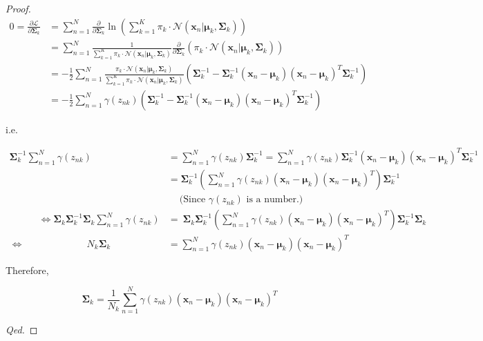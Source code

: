 \documentclass{article}
\begin{document}
\begin{proof}
    \vspace{-3em}
    \begin{align*}
        0 = \frac{\partial\mathcal{L}}{\partial\boldsymbol{\Sigma}_k} &= \sum_{n=1}^N\frac{\partial}{\partial\boldsymbol{\Sigma}_k}\ln\left(\sum_{k=1}^K\pi_k\cdot\mathcal{N}(\mathbf{x}_n|\boldsymbol{\mu}_k,\boldsymbol{\Sigma}_k)\right) \\
        &= \sum_{n=1}^N\frac{1}{\sum_{k=1}^K\pi_k\cdot\mathcal{N}(\mathbf{x}_n|\boldsymbol{\mu}_k,\boldsymbol{\Sigma}_k)}\frac{\partial}{\partial\boldsymbol{\Sigma}_k}\left(\pi_k\cdot\mathcal{N}(\mathbf{x}_n|\boldsymbol{\mu}_k,\boldsymbol{\Sigma}_k)\right) \\
        &= -\frac{1}{2}\sum_{n=1}^N \frac{\pi_k\cdot\mathcal{N}(\mathbf{x}_n|\boldsymbol{\mu}_k,\boldsymbol{\Sigma}_k)}{\sum_{k=1}^K\pi_k\cdot\mathcal{N}(\mathbf{x}_n|\boldsymbol{\mu}_k,\boldsymbol{\Sigma}_k)}\left(\boldsymbol{\Sigma}_k^{-1}
        -\boldsymbol{\Sigma}_k^{-1}(\mathbf{x}_n-\boldsymbol{\mu}_k)(\mathbf{x}_n-\boldsymbol{\mu}_k)^T\boldsymbol{\Sigma}_k^{-1}\right) \quad\\
        &= -\frac{1}{2}\sum_{n=1}^N\gamma(z_{nk})\left(\boldsymbol{\Sigma}_k^{-1}
        -\boldsymbol{\Sigma}_k^{-1}(\mathbf{x}_n-\boldsymbol{\mu}_k)(\mathbf{x}_n-\boldsymbol{\mu}_k)^T\boldsymbol{\Sigma}_k^{-1}\right)
    \end{align*}
    
    \vspace{-2em}
    i.e.
    
    \vspace{-3.8em}
    \begin{align*}
        \boldsymbol{\Sigma}_k^{-1}\sum_{n=1}^N\gamma(z_{nk}) &= \sum_{n=1}^N\gamma(z_{nk})\boldsymbol{\Sigma}_k^{-1} = \sum_{n=1}^N\gamma(z_{nk})\boldsymbol{\Sigma}_k^{-1}(\mathbf{x}_n-\boldsymbol{\mu}_k)(\mathbf{x}_n-\boldsymbol{\mu}_k)^T\boldsymbol{\Sigma}_k^{-1} \\
        &= \boldsymbol{\Sigma}_k^{-1}\left(\sum_{n=1}^N\gamma(z_{nk})(\mathbf{x}_n-\boldsymbol{\mu}_k)(\mathbf{x}_n-\boldsymbol{\mu}_k)^T\right)\boldsymbol{\Sigma}_k^{-1} \\
        &\quad\ \text{(Since $\gamma(z_{nk})$ is a number.)} \\
        \qquad\quad\Longleftrightarrow\boldsymbol{\Sigma}_k\boldsymbol{\Sigma}_k^{-1}\boldsymbol{\Sigma}_k\sum_{n=1}^N\gamma(z_{nk}) &= \
        \boldsymbol{\Sigma}_k\boldsymbol{\Sigma}_k^{-1}\left(\sum_{n=1}^N\gamma(z_{nk})(\mathbf{x}_n-\boldsymbol{\mu}_k)(\mathbf{x}_n-\boldsymbol{\mu}_k)^T\right)\boldsymbol{\Sigma}_k^{-1}\boldsymbol{\Sigma}_k \\
        \Longleftrightarrow\qquad\qquad\qquad\ \  N_k\boldsymbol{\Sigma}_k &= \sum_{n=1}^N\gamma(z_{nk})(\mathbf{x}_n-\boldsymbol{\mu}_k)(\mathbf{x}_n-\boldsymbol{\mu}_k)^T 
    \end{align*}
    
    
    Therefore, 
    
    \vspace{-3em}
    $$\boldsymbol{\Sigma}_k = \frac{1}{N_k}\sum_{n=1}^N\gamma(z_{nk})(\mathbf{x}_n-\boldsymbol{\mu}_k)(\mathbf{x}_n-\boldsymbol{\mu}_k)^T$$
    
\hspace{38em}
\textit{Qed.}
\end{proof}
\end{document}
